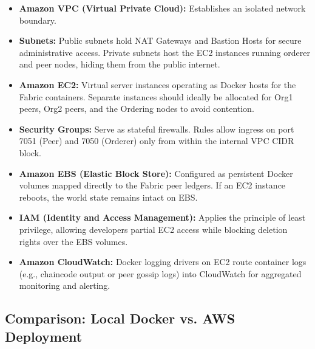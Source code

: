 \documentclass[12pt,a4paper]{article}
\begin{document}
\begin{itemize}
    \item \textbf{Amazon VPC (Virtual Private Cloud):} Establishes an isolated network boundary.
    \item \textbf{Subnets:} Public subnets hold NAT Gateways and Bastion Hosts for secure administrative access. Private subnets host the EC2 instances running orderer and peer nodes, hiding them from the public internet.
    \item \textbf{Amazon EC2:} Virtual server instances operating as Docker hosts for the Fabric containers. Separate instances should ideally be allocated for Org1 peers, Org2 peers, and the Ordering nodes to avoid contention.
    \item \textbf{Security Groups:} Serve as stateful firewalls. Rules allow ingress on port 7051 (Peer) and 7050 (Orderer) only from within the internal VPC CIDR block.
    \item \textbf{Amazon EBS (Elastic Block Store):} Configured as persistent Docker volumes mapped directly to the Fabric peer ledgers. If an EC2 instance reboots, the world state remains intact on EBS.
    \item \textbf{IAM (Identity and Access Management):} Applies the principle of least privilege, allowing developers partial EC2 access while blocking deletion rights over the EBS volumes.
    \item \textbf{Amazon CloudWatch:} Docker logging drivers on EC2 route container logs (e.g., chaincode output or peer gossip logs) into CloudWatch for aggregated monitoring and alerting.
\end{itemize}

\subsection{Comparison: Local Docker vs. AWS Deployment}
\end{document}
